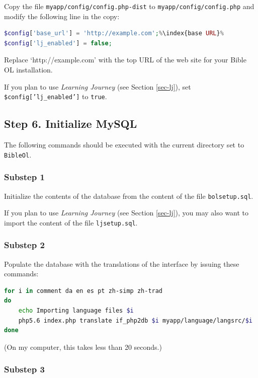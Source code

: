 \documentclass[11pt,oneside,a4paper]{memoir}
\begin{document}
Copy the file \texttt{myapp/config/config.php-dist} to \texttt{myapp/config/config.php} and modify the
following line in the copy:

\begin{lstlisting}[language=PHP]
$config['base_url'] = 'http://example.com';%\index{base URL}%
$config['lj_enabled'] = false;
\end{lstlisting}

Replace `http://example.com' with the top URL of the web site for your Bible OL installation.

If you plan to use \emph{Learning Journey} (see Section \ref{sec-lj}), set \texttt{\$config['lj\_enabled']} to \texttt{true}.


\subsection{Step 6. Initialize MySQL}

The following commands should be executed with the current directory set to \texttt{BibleOl}.

\subsubsection*{Substep 1}

Initialize the contents of the database from the content of the file \texttt{bolsetup.sql}.

If you plan to use \emph{Learning Journey} (see Section \ref{sec-lj}), you may also want to import
the content of the file \texttt{ljsetup.sql}.


\subsubsection*{Substep 2}

Populate the database with the translations of the interface by issuing these commands:

\begin{lstlisting}[language=bash]
for i in comment da en es pt zh-simp zh-trad
do
    echo Importing language files $i
    php5.6 index.php translate if_php2db $i myapp/language/langsrc/$i
done
\end{lstlisting}

(On my computer, this takes less than 20 seconds.)

\subsubsection*{Substep 3}
\end{document}
